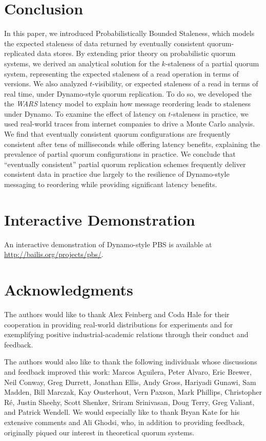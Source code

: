\documentclass{vldb}
\newcommand{\sectionskip}{-0em}
\begin{document}
\vspace{\sectionskip}\section{Conclusion}
\label{sec:conclusion}

In this paper, we introduced Probabilistically Bounded Staleness,
which models the expected staleness of data returned by eventually
consistent quorum-replicated data stores.  By extending prior theory
on probabilistic quorum systems, we derived an analytical solution for
the $k$-staleness of a partial quorum system, representing the
expected staleness of a read operation in terms of versions.  We also
analyzed $t$-visibility, or expected staleness of a read in terms of
real time, under Dynamo-style quorum replication.  To do so, we
developed the the \textit{WARS} latency model to explain how message
reordering leads to staleness under Dynamo.  To examine the effect of
latency on $t$-staleness in practice, we used real-world traces from
internet companies to drive a Monte Carlo analysis.  We find that
eventually consistent quorum configurations are frequently consistent
after tens of milliseconds while offering latency benefits, explaining
the prevalence of partial quorum configurations in practice.  We
conclude that ``eventually consistent'' partial quorum replication
schemes frequently deliver consistent data in practice due largely to
the resilience of Dynamo-style messaging to reordering while providing
significant latency benefits.

\vspace{\sectionskip}\section*{Interactive Demonstration} An
interactive demonstration of Dynamo-style PBS is available at
\url{http://bailis.org/projects/pbs/}.

\section*{Acknowledgments}

The authors would like to thank Alex Feinberg and Coda Hale for their
cooperation in providing real-world distributions for experiments and
for exemplifying positive industrial-academic relations through their
conduct and feedback.

The authors would also like to thank the following individuals whose
discussions and feedback improved this work: Marcos Aguilera, Peter
Alvaro, Eric Brewer, Neil Conway, Greg Durrett, Jonathan Ellis, Andy
Gross, Hariyadi Gunawi, Sam Madden, Bill Marczak, Kay Ousterhout, Vern
Paxson, Mark Phillips, Christopher R\'e, Justin Sheehy, Scott Shenker,
Sriram Srinivasan, Doug Terry, Greg Valiant, and Patrick Wendell.  We
would especially like to thank Bryan Kate for his extensive comments
and Ali Ghodsi, who, in addition to providing feedback, originally
piqued our interest in theoretical quorum systems.
\end{document}
